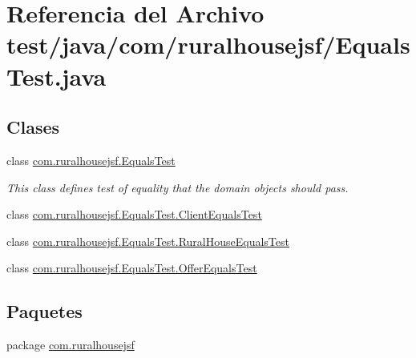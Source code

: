\hypertarget{a00092}{}\section{Referencia del Archivo test/java/com/ruralhousejsf/\+Equals\+Test.java}
\label{a00092}
\subsection*{Clases}
\begin{DoxyCompactItemize}
\item 
class \mbox{\hyperlink{a00248}{com.\+ruralhousejsf.\+Equals\+Test}}
\begin{DoxyCompactList}\small\item\em This class defines test of equality that the domain objects should pass. \end{DoxyCompactList}\item 
class \mbox{\hyperlink{a00252}{com.\+ruralhousejsf.\+Equals\+Test.\+Client\+Equals\+Test}}
\item 
class \mbox{\hyperlink{a00256}{com.\+ruralhousejsf.\+Equals\+Test.\+Rural\+House\+Equals\+Test}}
\item 
class \mbox{\hyperlink{a00260}{com.\+ruralhousejsf.\+Equals\+Test.\+Offer\+Equals\+Test}}
\end{DoxyCompactItemize}
\subsection*{Paquetes}
\begin{DoxyCompactItemize}
\item 
package \mbox{\hyperlink{a00110}{com.\+ruralhousejsf}}
\end{DoxyCompactItemize}
